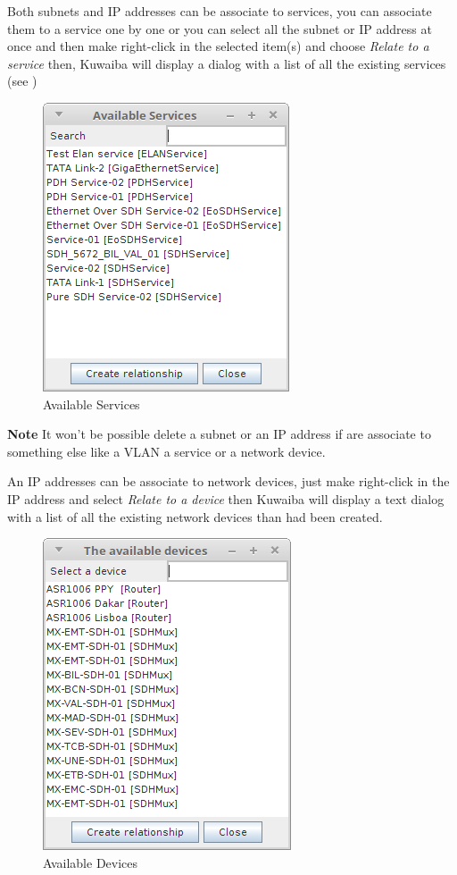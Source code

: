 \documentclass[a4paper]{article}
\begin{document}
		Both subnets and IP addresses can be associate to services, you can associate them to a service one by one or you can select all the subnet or IP address at once and then make right-click in the selected item(s) and choose \textit{Relate to a service} then, Kuwaiba will display a dialog with a list of all the existing services  (see \textbf{})
		\begin{figure}[h!]
			\centering
			\includegraphics[width=0.4\linewidth]{img/ipam_available_services.png}
			\caption{Available Services}
			\label{fig:ipam_available_services}
		\end{figure}
		\begin{framed} {\large \textbf{Note}}
			It won't be possible delete a subnet or an IP address if are associate to something else like a VLAN a service or a network device.
		\end{framed}		 		 
		

		\newpage
		An IP addresses can be associate to network devices, just make right-click in the IP address and select \textit{Relate to a device} then Kuwaiba will display a text dialog with a list of all the existing network devices than had been created.
		\begin{figure}[h!]
			\centering
			\includegraphics[width=0.4\linewidth]{img/ipam_available_devices.png}
			\caption{Available Devices}
			\label{fig:ipam_available_devices}
		\end{figure}
		
\end{document}
